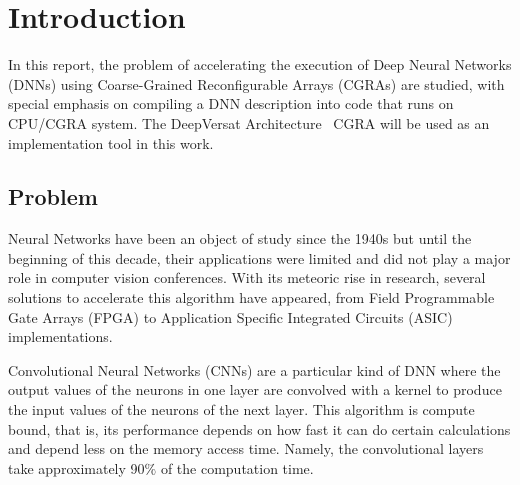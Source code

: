 
\chapter{Introduction}
\label{chapter:introduction}




In this report, the problem of accelerating the execution of Deep Neural
Networks (DNNs) using Coarse-Grained Reconfigurable Arrays (CGRAs) are studied,
with special emphasis on compiling a DNN description into code that runs on
CPU/CGRA system. The DeepVersat Architecture~\cite{valter:deepversat} CGRA will be used as an
implementation tool in this work.


\section{Problem}
\label{section:problem}

Neural Networks have been an object of study since the 1940s but until the
beginning of this decade, their applications were limited and did not play a
major role in computer vision conferences. With its meteoric rise in research,
several solutions to accelerate this algorithm have appeared, from Field Programmable Gate Arrays (FPGA) to
Application Specific Integrated Circuits (ASIC) implementations.

Convolutional Neural Networks (CNNs) are a particular kind of DNN where the output
values of the neurons in one layer are convolved with a kernel to produce the
input values of the neurons of the next layer. This algorithm is compute bound,
that is, its performance depends on how fast it can do certain calculations and
depend less on the memory access time. Namely, the convolutional layers take
approximately 90$\%$ of the computation time.

